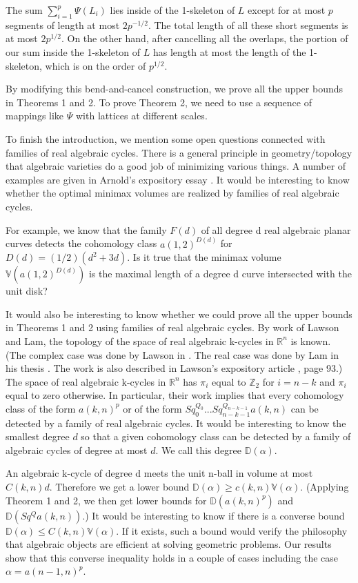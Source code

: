 \documentclass{amsart}
\newtheorem*{Theorem 1}{Theorem 1}
\newtheorem*{Theorem 2}{Theorem 2}
\newtheorem*{Theorem 1A}{Theorem 1A}
\newtheorem*{Theorem 2A}{Theorem 2A}
\newtheorem*{vanishing lemma}{Vanishing Lemma}
\numberwithin{equation}{section}
\begin{document}
The sum $\sum_{i=1}^p \Psi(L_i)$ lies inside of the 1-skeleton of $L$
except for at most $p$ segments of length at most $2 p^{-1/2}$.  The
total length of all these short segments is at most $2 p^{1/2}$.  On
the other hand, after cancelling all the overlaps, the portion of
our sum inside the 1-skeleton of $L$ has length at most the length
of the 1-skeleton, which is on the order of $p^{1/2}$.

By modifying this bend-and-cancel construction, we prove all
the upper bounds in Theorems 1 and 2.  To prove Theorem 2, we need
to use a sequence of mappings like $\Psi$ with lattices at different
scales.

To finish the introduction, we mention some open questions
connected with families of real algebraic cycles.
There is a general principle in
geometry/topology that algebraic varieties do a good job of
minimizing various things.  A number of examples are given in
Arnold's expository essay \cite{Ar}.  It would be interesting to know
whether the optimal minimax volumes are realized by
families of real algebraic cycles.  

For example, we know that the family $F(d)$ of all
degree d real algebraic planar curves detects the cohomology
class $a(1,2)^{D(d)}$ for $D(d) = (1/2) (d^2 + 3d)$.  Is it
true that the minimax volume $\mathbb{V}(a(1,2)^{D(d)})$
is the maximal length of a degree d curve intersected
with the unit disk?

It would also be interesting to know whether we could prove all
the upper bounds in Theorems 1 and 2 using families of
real algebraic cycles.  By work of Lawson and Lam,
the topology of the space of real algebraic k-cycles in $\mathbb{R}^n$ 
is known.  (The complex case was done by Lawson in \cite{L}.  The real
case was done by Lam in his thesis \cite{La}.  The work is also described
in Lawson's expository article \cite{L2}, page 93.)  The space
of real algebraic k-cycles in $\mathbb{R}^n$ has $\pi_i$ equal to 
$\mathbb{Z}_2$ for $i = n-k$ and $\pi_i$ equal to zero otherwise.  
In particular, their work implies that every cohomology class of the 
form $a(k,n)^p$ or of the form $Sq_0^{Q_0} ... Sq_{n-k-1}^{Q_{n-k-1}} a(k,n)$ can
be detected by a family of real algebraic cycles.  It would be
interesting to know the smallest degree $d$ so that a given cohomology
class can be detected by a family of algebraic cycles of degree
at most $d$.  We call this degree $\mathbb{D}(\alpha)$.

An algebraic k-cycle of degree d meets the unit n-ball in volume
at most $C(k,n) d$.  Therefore we get a lower bound $\mathbb{D}(\alpha)
\ge c(k,n) \mathbb{V}(\alpha)$.  (Applying Theorem 1 and 2, we then
get lower bounds for $\mathbb{D}(a(k,n)^p)$ and $\mathbb{D}(Sq^Q a(k,n))$.)
It would be interesting to know if there is a converse bound
$\mathbb{D}(\alpha) \le C(k,n) \mathbb{V}(\alpha)$.  If it exists,
such a bound would verify the philosophy that algebraic objects
are efficient at solving geometric problems.  Our results show that
this converse inequality holds in a couple of cases including
the case $\alpha = a(n-1,n)^p$.
\end{document}

